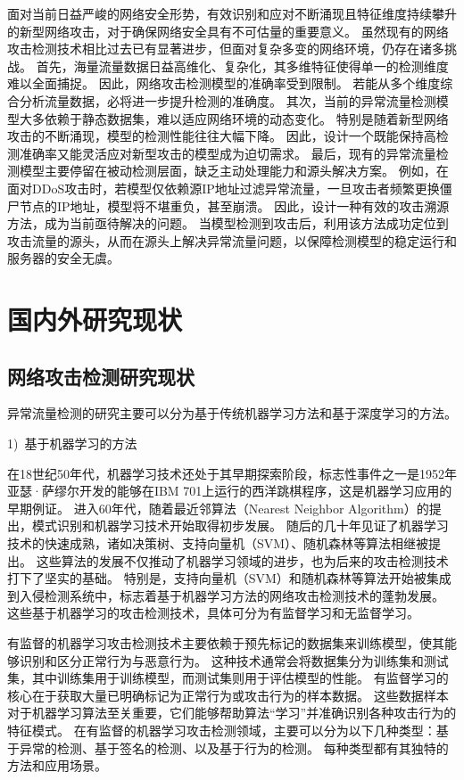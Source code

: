 面对当前日益严峻的网络安全形势，有效识别和应对不断涌现且特征维度持续攀升的新型网络攻击，对于确保网络安全具有不可估量的重要意义。
虽然现有的网络攻击检测技术相比过去已有显著进步，但面对复杂多变的网络环境，仍存在诸多挑战。
首先，海量流量数据日益高维化、复杂化，其多维特征使得单一的检测维度难以全面捕捉。
因此，网络攻击检测模型的准确率受到限制。
若能从多个维度综合分析流量数据，必将进一步提升检测的准确度。
其次，当前的异常流量检测模型大多依赖于静态数据集，难以适应网络环境的动态变化。
特别是随着新型网络攻击的不断涌现，模型的检测性能往往大幅下降。
因此，设计一个既能保持高检测准确率又能灵活应对新型攻击的模型成为迫切需求。
最后，现有的异常流量检测模型主要停留在被动检测层面，缺乏主动处理能力和源头解决方案。
例如，在面对DDoS攻击时，若模型仅依赖源IP地址过滤异常流量，一旦攻击者频繁更换僵尸节点的IP地址，模型将不堪重负，甚至崩溃。
因此，设计一种有效的攻击溯源方法，成为当前亟待解决的问题。
当模型检测到攻击后，利用该方法成功定位到攻击流量的源头，从而在源头上解决异常流量问题，以保障检测模型的稳定运行和服务器的安全无虞。

\section{国内外研究现状}

\subsection{网络攻击检测研究现状}
异常流量检测的研究主要可以分为基于传统机器学习方法和基于深度学习的方法。\par
1)~基于机器学习的方法\par
在18世纪50年代，机器学习技术还处于其早期探索阶段，标志性事件之一是1952年亚瑟·萨缪尔开发的能够在IBM 701上运行的西洋跳棋程序，这是机器学习应用的早期例证。
进入60年代，随着最近邻算法（Nearest Neighbor Algorithm）\cite{taunk2019brief}的提出，模式识别和机器学习技术开始取得初步发展。
随后的几十年见证了机器学习技术的快速成熟，诸如决策树\cite{charbuty2021classification}、支持向量机（SVM）\cite{zhang2021support}、随机森林\cite{athey2019generalized}等算法相继被提出。
这些算法的发展不仅推动了机器学习领域的进步，也为后来的攻击检测技术打下了坚实的基础。
特别是，支持向量机（SVM）和随机森林等算法开始被集成到入侵检测系统中，标志着基于机器学习方法的网络攻击检测技术的蓬勃发展\cite{amaran2021intrusion}。
这些基于机器学习的攻击检测技术，具体可分为有监督学习和无监督学习。



有监督的机器学习攻击检测技术主要依赖于预先标记的数据集来训练模型，使其能够识别和区分正常行为与恶意行为。
这种技术通常会将数据集分为训练集和测试集，其中训练集用于训练模型，而测试集则用于评估模型的性能。
有监督学习的核心在于获取大量已明确标记为正常行为或攻击行为的样本数据。
这些数据样本对于机器学习算法至关重要，它们能够帮助算法“学习”并准确识别各种攻击行为的特征模式。
在有监督的机器学习攻击检测领域，主要可以分为以下几种类型：基于异常的检测、基于签名的检测、以及基于行为的检测。
每种类型都有其独特的方法和应用场景。


